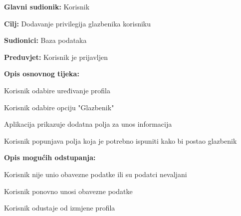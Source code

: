 			\noindent {}
			\begin{packed_item}
				
				\item \textbf{Glavni sudionik: } Korisnik
				\item  \textbf{Cilj:} Dodavanje privilegija glazbenika korisniku
				\item  \textbf{Sudionici:} Baza podataka
				\item  \textbf{Preduvjet:} Korisnik je prijavljen
				\item  \textbf{Opis osnovnog tijeka:} 
				
				\item[] \begin{packed_enum}
					
					\item Korisnik odabire uređivanje profila
					\item Korisnik odabire opciju "Glazbenik"
					\item Aplikacija prikazuje dodatna polja za unos informacija
					\item Korisnik popunjava polja koja je potrebno ispuniti kako bi postao glazbenik
			
				\end{packed_enum}
			    \item  \textbf{Opis mogućih odstupanja:}
			
				\item[] \begin{packed_item}
					
					\item[4.a] Korisnik nije unio obavezne podatke ili su podatci nevaljani
					\item[] \begin{packed_enum}
						
						\item Korisnik ponovno unosi obavezne podatke
						\item Korisnik odustaje od izmjene profila
						
					\end{packed_enum}
					
				\end{packed_item}
			\end{packed_item}	
		
